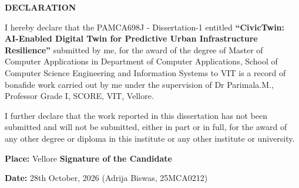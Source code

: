 \begin{center}
    {\fontsize{14pt}{18pt}\selectfont \textbf{DECLARATION}\par}
\end{center}
\vspace{1.5cm}

\noindent I hereby declare that the PAMCA698J - Dissertation-1 entitled \textbf{``CivicTwin: AI-Enabled Digital Twin for Predictive Urban Infrastructure Resilience''} submitted by me, for the award of the degree of Master of Computer Applications in Department of Computer Applications, School of Computer Science Engineering and Information Systems to VIT is a record of bonafide work carried out by me under the supervision of Dr Parimala.M., Professor Grade I, SCORE, VIT, Vellore.

\vspace{0.8cm}
\noindent I further declare that the work reported in this dissertation has not been submitted and will not be submitted, either in part or in full, for the award of any other degree or diploma in this institute or any other institute or university.

\vspace{3.5cm}
\noindent \textbf{Place:} Vellore \hfill \textbf{Signature of the Candidate}

\vspace{0.3cm}
\noindent \textbf{Date:} 28th October, 2026 \hfill (Adrija Biswas, 25MCA0212)

\clearpage
